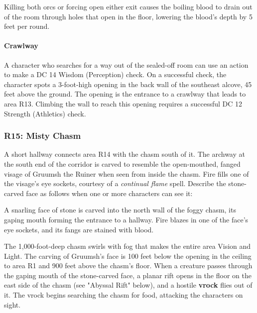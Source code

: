 \documentclass[10pt,a4,twoside,twocolumn,openany,nodeprecatedcode]{dndbook}
\begin{document}
Killing both orcs or forcing open either exit causes the boiling blood to drain out of the room through holes that open in the floor, lowering the blood's depth by 5 feet per round.
\paragraph{Crawlway}
A character who searches for a way out of the sealed-off room can use an action to make a DC 14 Wisdom (Perception) check. On a successful check, the character spots a 3-foot-high opening in the back wall of the southeast alcove, 45 feet above the ground. The opening is the entrance to a crawlway that leads to area R13. Climbing the wall to reach this opening requires a successful DC 12 Strength (Athletics) check.
\subsubsection{R15: Misty Chasm}
A short hallway connects area R14 with the chasm south of it. The archway at the south end of the corridor is carved to resemble the open-mouthed, fanged visage of Gruumsh the Ruiner when seen from inside the chasm. Fire fills one of the visage's eye sockets, courtesy of a \textit{continual flame} spell.
Describe the stone-carved face as follows when one or more characters can see it:
\begin{DndReadAloud}{}
A snarling face of stone is carved into the north wall of the foggy chasm, its gaping mouth forming the entrance to a hallway. Fire blazes in one of the face's eye sockets, and its fangs are stained with blood.
\end{DndReadAloud}

The 1,000-foot-deep chasm swirls with fog that makes the entire area Vision and Light. The carving of Gruumsh's face is 100 feet below the opening in the ceiling to area R1 and 900 feet above the chasm's floor.
When a creature passes through the gaping mouth of the stone-carved face, a planar rift opens in the floor on the east side of the chasm (see "Abyssal Rift" below), and a hostile \textbf{vrock} flies out of it. The vrock begins searching the chasm for food, attacking the characters on sight.
\end{document}
